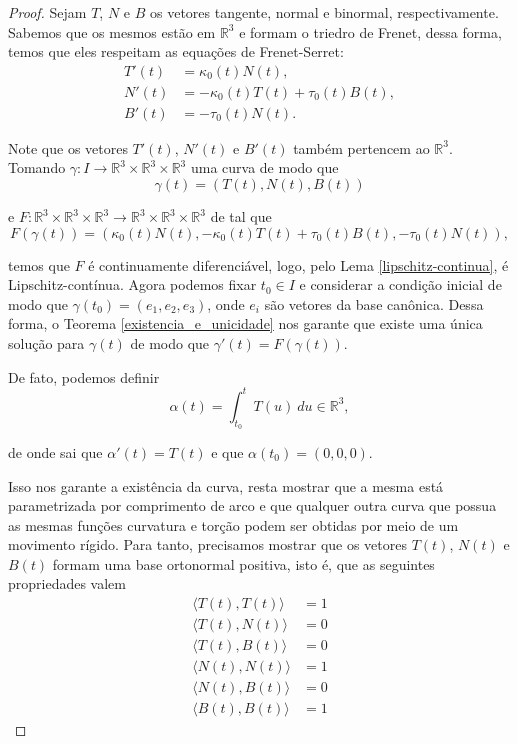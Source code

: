 \documentclass{article}
\begin{document}
\begin{proof}
    Sejam $T$, $N$ e $B$ os vetores tangente, normal e binormal, respectivamente. Sabemos que os mesmos estão em $\mathbb{R}^3$ e formam o triedro de Frenet, dessa forma, temos que eles respeitam as equações de Frenet-Serret:
    \begin{equation}
        \begin{split}
            T'(t) & = \kappa_0(t) N(t), \\
            N'(t) & = -\kappa_0(t) T(t) + \tau_0(t) B(t), \\
            B'(t) & = -\tau_0(t) N(t).
        \end{split}
        \label{frenet}
    \end{equation}
    
    Note que os vetores $T'(t)$, $N'(t)$ e $B'(t)$ também pertencem ao $\mathbb{R}^3$. Tomando $\gamma : I\to \mathbb{R}^3\times \mathbb{R}^3\times \mathbb{R}^3$ uma curva de modo que
    \[\gamma(t) = \left(T(t), N(t), B(t)\right)\]
    
    \noindent e $F : \mathbb{R}^3\times \mathbb{R}^3\times \mathbb{R}^3\to \mathbb{R}^3\times \mathbb{R}^3\times \mathbb{R}^3$ de tal que
    \[F(\gamma(t)) = \left(\kappa_0(t) N(t), -\kappa_0(t) T(t) + \tau_0(t) B(t), -\tau_0(t) N(t)\right),\]
    
    \noindent temos que $F$ é continuamente diferenciável, logo, pelo Lema \ref{lipschitz-continua}, é Lipschitz-contínua. Agora podemos fixar $t_0\in I$ e considerar a condição inicial de modo que $\gamma(t_0) = \left(e_1, e_2, e_3\right)$, onde $e_i$ são vetores da base canônica. Dessa forma, o Teorema \ref{existencia_e_unicidade} nos garante que existe uma única solução para $\gamma(t)$ de modo que $\gamma'(t) = F(\gamma(t))$.
    
    De fato, podemos definir
    \[\alpha(t) = \int_{t_0}^{t} T(u) ~du \in \mathbb{R}^3,\]
    
    \noindent de onde sai que $\alpha'(t) = T(t)$ e que $\alpha(t_0) = (0, 0, 0)$. 
    
    Isso nos garante a existência da curva, resta mostrar que a mesma está parametrizada por comprimento de arco e que qualquer outra curva que possua as mesmas funções curvatura e torção podem ser obtidas por meio de um movimento rígido. Para tanto, precisamos mostrar que os vetores $T(t)$, $N(t)$ e $B(t)$ formam uma base ortonormal positiva, isto é, que as seguintes propriedades valem
    \begin{equation}
        \begin{split}
            \langle T(t), T(t)\rangle & = 1 \\
            \langle T(t), N(t)\rangle & = 0 \\
            \langle T(t), B(t)\rangle & = 0 \\
            \langle N(t), N(t)\rangle & = 1 \\
            \langle N(t), B(t)\rangle & = 0 \\
            \langle B(t), B(t)\rangle & = 1
        \end{split}
        \label{condicoes_escalares}
    \end{equation}
    

\end{proof}
\end{document}
